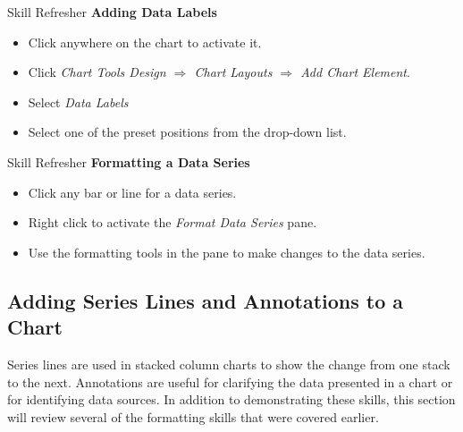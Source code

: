 \begin{center}
	\begin{sklbox}{Skill Refresher}
		\textbf{Adding Data Labels}
		\\
		\begin{itemize}
			\setlength{\itemsep}{0pt}
			\setlength{\parskip}{0pt}
			\setlength{\parsep}{0pt}

			\item Click anywhere on the chart to activate it.
			\item Click \textit{Chart Tools Design $ \Rightarrow $ Chart Layouts $ \Rightarrow $ Add Chart Element}.
			\item Select \textit{Data Labels}
			\item Select one of the preset positions from the drop-down list.
			
		\end{itemize}
	\end{sklbox}
\end{center}

\begin{center}
	\begin{sklbox}{Skill Refresher}
		\textbf{Formatting a Data Series}
		\\
		\begin{itemize}
			\setlength{\itemsep}{0pt}
			\setlength{\parskip}{0pt}
			\setlength{\parsep}{0pt}
			
			\item Click any bar or line for a data series.
			\item Right click to activate the \textit{Format Data Series} pane.
			\item Use the formatting tools in the pane to make changes to the data series.
			
		\end{itemize}
	\end{sklbox}
\end{center}

\subsection{Adding Series Lines and Annotations to a Chart}

Series lines are used in stacked column charts to show the change from one stack to the next. Annotations are useful for clarifying the data presented in a chart or for identifying data sources. In addition to demonstrating these skills, this section will review several of the formatting skills that were covered earlier. 

